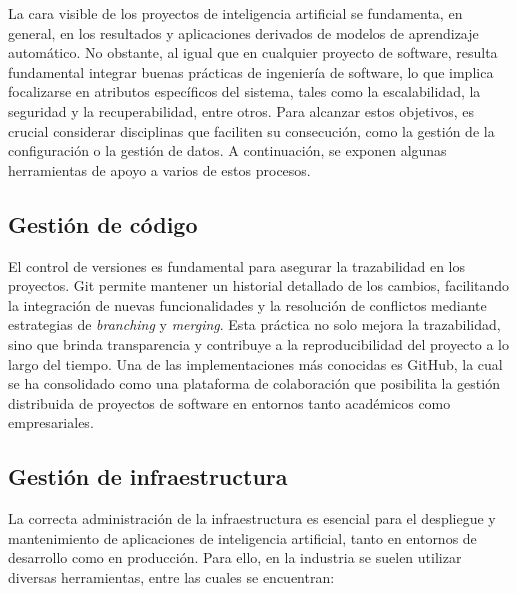 La cara visible de los proyectos de inteligencia artificial se fundamenta, en general, en los resultados y aplicaciones derivados de modelos de aprendizaje automático. No obstante, al igual que en cualquier proyecto de software, resulta fundamental integrar buenas prácticas de ingeniería de software, lo que implica focalizarse en atributos específicos del sistema, tales como la escalabilidad, la seguridad y la recuperabilidad, entre otros. Para alcanzar estos objetivos, es crucial considerar disciplinas que faciliten su consecución, como la gestión de la configuración o la gestión de datos. A continuación, se exponen algunas herramientas de apoyo a varios de estos procesos.

\subsection{Gestión de código}

El control de versiones es fundamental para asegurar la trazabilidad en los proyectos. Git permite mantener un historial detallado de los cambios, facilitando la integración de nuevas funcionalidades y la resolución de conflictos mediante estrategias de \textit{branching} y \textit{merging}. Esta práctica no solo mejora la trazabilidad, sino que brinda transparencia y contribuye a la reproducibilidad del proyecto a lo largo del tiempo. Una de las implementaciones más conocidas es GitHub, la cual se ha consolidado como una plataforma de colaboración que posibilita la gestión distribuida de proyectos de software en entornos tanto académicos como empresariales.

\subsection{Gestión de infraestructura}

La correcta administración de la infraestructura es esencial para el despliegue y mantenimiento de aplicaciones de inteligencia artificial, tanto en entornos de desarrollo como en producción. Para ello, en la industria se suelen utilizar diversas herramientas, entre las cuales se encuentran:

